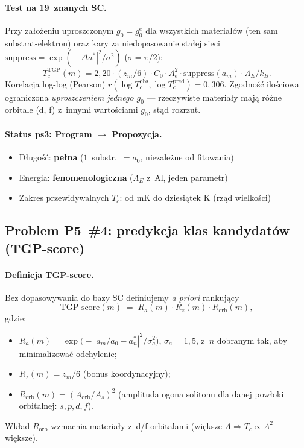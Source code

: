 \paragraph{Test na 19~znanych SC.}
Przy za\l{}o\.zeniu uproszczonym $g_0 = g_0^e$ dla wszystkich materia\l{}\'ow
(ten sam substrat-elektron) oraz kary za niedopasowanie sta\l{}ej sieci
$\text{suppress} = \exp(-|\Delta a^*|^2/\sigma^2)$ ($\sigma = \pi/2$):
\[
  T_c^\text{TGP}(m) = 2{,}20 \cdot (z_m/6)\cdot C_0\cdot A_e^2
                    \cdot \text{suppress}(a_m)\cdot \Lambda_E/k_B.
\]
Korelacja log-log (Pearson) $r(\log T_c^\text{obs}, \log T_c^\text{pred}) = 0{,}306$.
Zgodno\'s\'c ilo\'sciowa ograniczona \emph{uproszczeniem jednego $g_0$}
--- rzeczywiste materia\l{}y maj\k{a} r\'o\.zne orbitale (d, f) z~innymi
warto\'sciami $g_0$, st\k{a}d rozrzut.

\paragraph{Status ps3: Program $\to$ Propozycja.}
\begin{itemize}[nosep]
  \item D\l{}ugo\'s\'c: \textbf{pe\l{}na} ($1$~substr.~$= a_0$, niezale\.zne od fitowania)
  \item Energia: \textbf{fenomenologiczna} ($\Lambda_E$ z~Al, jeden parametr)
  \item Zakres przewidywalnych $T_c$: od mK do dziesi\k{a}tek K (rz\k{a}d wielko\'sci)
\end{itemize}

\subsection{Problem P5~\#4: predykcja klas kandydat\'ow (TGP-score)}%
\label{app:P5-ps4}

\paragraph{Definicja TGP-score.}
Bez dopasowywania do bazy SC definiujemy \emph{a priori} rankujący
\begin{equation}
\label{eq:P5-score}
  \text{TGP-score}(m)
  \;=\;
  R_a(m)\cdot R_z(m)\cdot R_\text{orb}(m),
\end{equation}
gdzie:
\begin{itemize}\itemsep0pt
  \item $R_a(m) = \exp\!\bigl(-|a_m/a_0 - a^*_n|^2/\sigma_a^2\bigr)$, $\sigma_a = 1{,}5$,
    z~$n$ dobranym tak, aby minimalizowa\'c odchylenie;
  \item $R_z(m) = z_m/6$ (bonus koordynacyjny);
  \item $R_\text{orb}(m) = (A_\text{orb}/A_s)^2$ (amplituda ogona
    solitonu dla danej pow\l{}oki orbitalnej: $s, p, d, f$).
\end{itemize}
Wk\l{}ad $R_\text{orb}$ wzmacnia materia\l{}y z~d/f-orbitalami
(wi\k{e}ksze $A \Rightarrow T_c \propto A^2$ wi\k{e}ksze).

